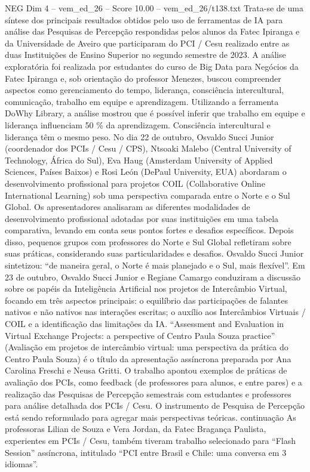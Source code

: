 \begin{textsample}{NEG Dim 4 – vem\_ed\_26 – Score 10.00 – vem\_ed\_26/t138.txt}
Trata-se de uma síntese dos principais resultados obtidos pelo uso de ferramentas de IA para análise das Pesquisas de Percepção respondidas pelos alunos da Fatec Ipiranga e da Universidade de Aveiro que participaram do PCI / Cesu realizado entre as duas Instituições de Ensino Superior no segundo semestre de 2023.
A análise exploratória foi realizada por estudantes do curso de Big Data para Negócios da Fatec Ipiranga e, sob orientação do professor Menezes, buscou compreender aspectos como gerenciamento do tempo, liderança, consciência intercultural, comunicação, trabalho em equipe e aprendizagem.
Utilizando a ferramenta DoWhy Library, a análise mostrou que é possível inferir que trabalho em equipe e liderança influenciam 50 \% da aprendizagem.
Consciência intercultural e liderança têm o mesmo peso.
No dia 22 de outubro, Osvaldo Succi Junior (coordenador dos PCIs / Cesu / CPS), Ntsoaki Malebo (Central University of Technology, África do Sul), Eva Haug (Amsterdam University of Applied Sciences, Países Baixos) e Rosi León (DePaul University, EUA) abordaram o desenvolvimento profissional para projetos COIL (Collaborative Online International Learning) sob uma perspectiva comparada entre o Norte e o Sul Global.
Os apresentadores analisaram as diferentes modalidades de desenvolvimento profissional adotadas por suas instituições em uma tabela comparativa, levando em conta seus pontos fortes e desafios específicos.
Depois disso, pequenos grupos com professores do Norte e Sul Global refletiram sobre suas práticas, considerando suas particularidades e desafios.
Osvaldo Succi Junior sintetizou: “de maneira geral, o Norte é mais planejado e o Sul, mais flexível”.
Em 23 de outubro, Osvaldo Succi Junior e Regiane Camargo conduziram a discussão sobre os papéis da Inteligência Artificial nos projetos de Intercâmbio Virtual, focando em três aspectos principais: o equilíbrio das participações de falantes nativos e não nativos nas interações escritas; o auxílio aos Intercâmbios Virtuais / COIL e a identificação das limitações da IA. “Assessment and Evaluation in Virtual Exchange Projects: a perspective of Centro Paula Souza practice” (Avaliação em projetos de intercâmbio virtual: uma perspectiva da prática do Centro Paula Souza) é o título da apresentação assíncrona preparada por Ana Carolina Freschi e Neusa Gritti.
O trabalho apontou exemplos de práticas de avaliação dos PCIs, como feedback (de professores para alunos, e entre pares) e a realização das Pesquisas de Percepção semestrais com estudantes e professores para análise detalhada dos PCIs / Cesu.
O instrumento de Pesquisa de Percepção está sendo reformulado para agregar mais perspectivas teóricas. continuação As professoras Lilian de Souza e Vera Jordan, da Fatec Bragança Paulista, experientes em PCIs / Cesu, também tiveram trabalho selecionado para “Flash Session” assíncrona, intitulado “PCI entre Brasil e Chile: uma conversa em 3 idiomas”.

\end{textsample}
